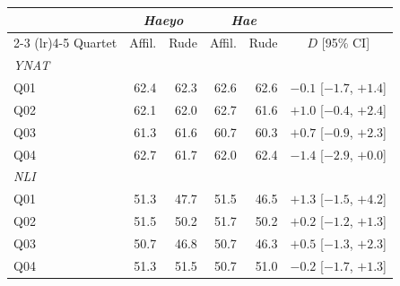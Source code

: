 \begin{tabular}{lrrrrc}
\toprule
 & \multicolumn{2}{c}{\textit{Haeyo}} & \multicolumn{2}{c}{\textit{Hae}} & \\
\cmidrule(lr){2-3} \cmidrule(lr){4-5}
Quartet & Affil. & Rude & Affil. & Rude & $D$ [95\% CI] \\
\midrule
\multicolumn{6}{l}{\textit{YNAT}} \\
Q01 & 62.4 & 62.3 & 62.6 & 62.6 & $-0.1$ [$-1.7$, $+1.4$] \\
Q02 & 62.1 & 62.0 & 62.7 & 61.6 & $+1.0$ [$-0.4$, $+2.4$] \\
Q03 & 61.3 & 61.6 & 60.7 & 60.3 & $+0.7$ [$-0.9$, $+2.3$] \\
Q04 & 62.7 & 61.7 & 62.0 & 62.4 & $-1.4$ [$-2.9$, $+0.0$] \\
\multicolumn{6}{l}{\textit{NLI}} \\
Q01 & 51.3 & 47.7 & 51.5 & 46.5 & $+1.3$ [$-1.5$, $+4.2$] \\
Q02 & 51.5 & 50.2 & 51.7 & 50.2 & $+0.2$ [$-1.2$, $+1.3$] \\
Q03 & 50.7 & 46.8 & 50.7 & 46.3 & $+0.5$ [$-1.3$, $+2.3$] \\
Q04 & 51.3 & 51.5 & 50.7 & 51.0 & $-0.2$ [$-1.7$, $+1.3$] \\
\bottomrule
\end{tabular}
